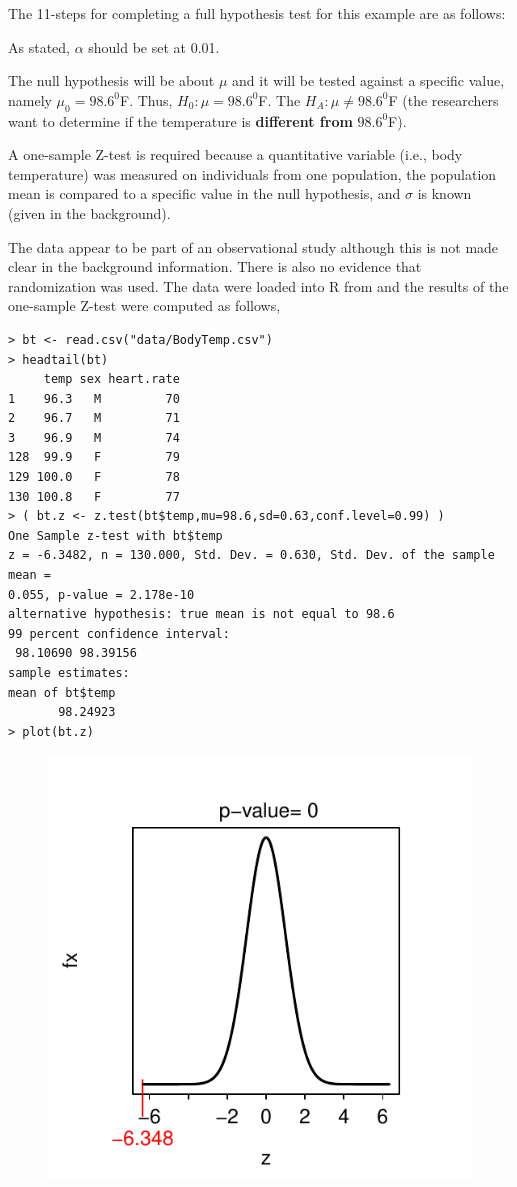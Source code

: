 \documentclass[10pt,openany]{book}\usepackage[]{graphicx}\usepackage[]{color}
\makeatletter
\newenvironment{kframe}{%
 \def\at@end@of@kframe{}%
 \ifinner\ifhmode%
  \def\at@end@of@kframe{\end{minipage}}%
  \begin{minipage}{\columnwidth}%
 \fi\fi%
 \def\FrameCommand##1{\hskip\@totalleftmargin \hskip-\fboxsep
 \colorbox{shadecolor}{##1}\hskip-\fboxsep
     \hskip-\linewidth \hskip-\@totalleftmargin \hskip\columnwidth}%
 \MakeFramed {\advance\hsize-\width
   \@totalleftmargin\z@ \linewidth\hsize
   \@setminipage}}%
 {\par\unskip\endMakeFramed%
 \at@end@of@kframe}
\newenvironment{knitrout}{}{} %
\makeatother
\begin{document}
The 11-steps  for completing a full hypothesis test for this example are as follows:
\begin{Enumerate}
  \item As stated, $\alpha$ should be set at 0.01.
  \item The null hypothesis will be about $\mu$ and it will be tested against a specific value, namely $\mu_{0}=98.6^{0}$F.  Thus, $H_{0}:\mu=98.6^{0}$F.  The $H_{A}:\mu\neq98.6^{0}$F (the researchers want to determine if the temperature is \textbf{different from} $98.6^{0}$F).
  \item A one-sample Z-test is required because a quantitative variable (i.e., body temperature) was measured on individuals from one population, the population mean is compared to a specific value in the null hypothesis, and $\sigma$ is known (given in the background).
  \item The data appear to be part of an observational study although this is not made clear in the background information.  There is also no evidence that randomization was used.  The data were loaded into R from  and the results of the one-sample Z-test were computed as follows,
\begin{knitrout}
\color{fgcolor}\begin{kframe}
\begin{verbatim}
> bt <- read.csv("data/BodyTemp.csv")
> headtail(bt)
     temp sex heart.rate
1    96.3   M         70
2    96.7   M         71
3    96.9   M         74
128  99.9   F         79
129 100.0   F         78
130 100.8   F         77
> ( bt.z <- z.test(bt$temp,mu=98.6,sd=0.63,conf.level=0.99) )
One Sample z-test with bt$temp 
z = -6.3482, n = 130.000, Std. Dev. = 0.630, Std. Dev. of the sample mean =
0.055, p-value = 2.178e-10
alternative hypothesis: true mean is not equal to 98.6 
99 percent confidence interval:
 98.10690 98.39156 
sample estimates:
mean of bt$temp 
       98.24923 
> plot(bt.z)
\end{verbatim}
\end{kframe}\begin{figure}[!h]

{\centering \includegraphics[width=.3\linewidth]{Figs/Ex2Zpvalue-1} 

}
\end{figure}
\end{knitrout}
\end{Enumerate}
\end{document}
